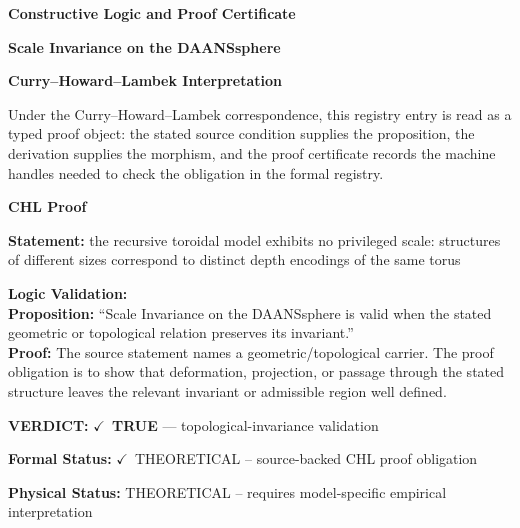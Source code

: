 \clearpage
\begingroup\tzpsupportsetup
\noindent\textbf{\fontsize{10.8pt}{12.8pt}\selectfont [ID 0362] Constructive Logic and Proof Certificate}\par
\noindent\textbf{\fontsize{10pt}{12pt}\selectfont Scale Invariance on the DAANSsphere}\par
\vspace{0.45em}
\begingroup
\footnotesize
\setlength{\parskip}{0.22em}
\setlength{\parindent}{0pt}
\noindent\textbf{Curry--Howard--Lambek Interpretation}\par
Under the Curry--Howard--Lambek correspondence, this registry entry is read as a typed proof
object: the stated source condition supplies the proposition, the derivation supplies the
morphism, and the proof certificate records the machine handles needed to check the obligation
in the formal registry.

\vspace{0.45em}
\noindent\textbf{CHL Proof}\par
\textbf{Statement:} the recursive toroidal model exhibits no privileged scale: structures of different sizes
correspond to distinct depth encodings of the same torus

\textbf{Logic Validation:}\\
\textbf{Proposition:} ``Scale Invariance on the DAANSsphere is valid when the stated geometric or topological
relation preserves its invariant.''\\
\textbf{Proof:} The source statement names a geometric/topological carrier. The proof obligation is to
show that deformation, projection, or passage through the stated structure leaves the
relevant invariant or admissible region well defined.

\textbf{VERDICT:} \ensuremath{\checkmark}\ \textbf{TRUE} --- topological-invariance validation

\textbf{Formal Status:} \ensuremath{\checkmark}\ THEORETICAL -- source-backed CHL proof obligation

\textbf{Physical Status:} THEORETICAL -- requires model-specific empirical interpretation
\par\vspace{0.45em}
\par
\ifTZPDarkEdition
{}
\fi
\endgroup
\endgroup
